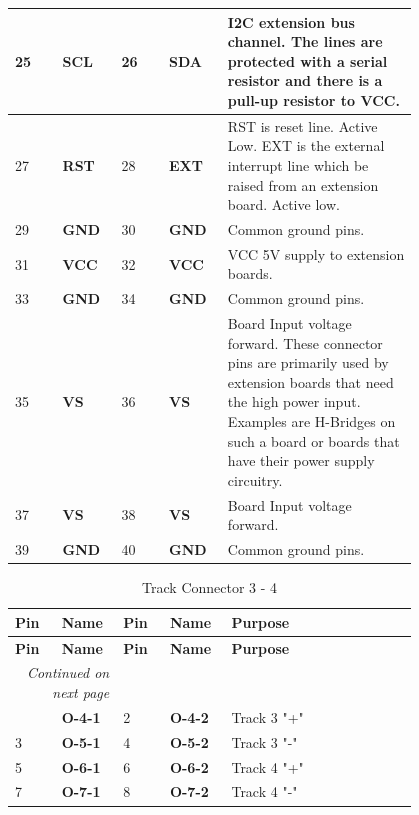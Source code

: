 \begin{longtable}{@{}|p{0.1\linewidth}|p{0.1\linewidth}|p{0.1\linewidth}|p{0.1\linewidth}|p{0.4\linewidth}|@{}}
    \midrule
    25 & \textbf{SCL} & 26 & \textbf{SDA} & I2C extension bus channel.  The lines are protected with a serial resistor and there is a pull-up resistor to VCC. \\
    \midrule
    27 & \textbf{RST} & 28 & \textbf{EXT} & RST is reset line. Active Low. EXT is the external interrupt line which be raised from an extension board. Active low. \\
    \midrule
    29 & \textbf{GND} & 30 & \textbf{GND} & Common ground pins. \\
    \midrule
    31 & \textbf{VCC} & 32 & \textbf{VCC} & VCC 5V supply to extension boards. \\
    \midrule
    33 & \textbf{GND} & 34 & \textbf{GND} & Common ground pins. \\
    \midrule
    35 & \textbf{VS} & 36 & \textbf{VS} & Board Input voltage forward. These  connector pins are primarily used by extension boards that need the high power input. Examples  are H-Bridges on such a board or boards that have their power supply circuitry. \\
    \midrule
    37 & \textbf{VS} & 38 & \textbf{VS} & Board Input voltage forward. \\
    \midrule
    39 & \textbf{GND} & 40 & \textbf{GND} & Common ground pins. \\
    \midrule
\end{longtable}  

\begin{longtable}{@{}|p{0.1\linewidth}|p{0.1\linewidth}|p{0.1\linewidth}|p{0.1\linewidth}|p{0.4\linewidth}|@{}}
    \caption{Track Connector 3 - 4} \\
    \toprule
    \textbf{Pin} & \textbf{Name} & \textbf{Pin} & \textbf{Name} & \textbf{Purpose} \\
    \midrule
    \endfirsthead
    \toprule
    \textbf{Pin} & \textbf{Name} & \textbf{Pin} & \textbf{Name} & \textbf{Purpose} \\
    \midrule
    \endhead
    \midrule
    \multicolumn{2}{r}{\textit{Continued on next page}} \\
    \midrule
    \endfoot
    \bottomrule
    \endlastfoot
    1 & \textbf{O-4-1} & 2 & \textbf{O-4-2} & Track 3 "+" \\
    \midrule
    3 & \textbf{O-5-1} & 4 & \textbf{O-5-2} & Track 3 "-"\\
    \midrule
    5 & \textbf{O-6-1} & 6 & \textbf{O-6-2} & Track 4 "+"\\
    \midrule
    7 & \textbf{O-7-1} & 8 & \textbf{O-7-2} & Track 4 "-"\\
    \midrule
\end{longtable}  




